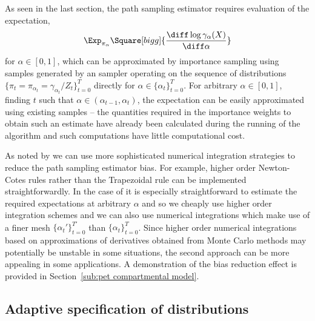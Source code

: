 As seen in the last section, the path sampling estimator requires evaluation
of the expectation,
\begin{equation*}
  \Exp_{\pi_\alpha}\Square[bigg]{
    \frac{\diff\log\gamma_{\alpha}(X)}{\diff\alpha}}
\end{equation*}
for $\alpha\in[0,1]$, which can be approximated by importance sampling using
samples generated by an \smc sampler operating on the sequence of
distributions $\{\pi_t = \pi_{\alpha_t} = \gamma_{\alpha_t}/Z_t\}_{t=0}^T$
directly for $\alpha\in\{\alpha_t\}_{t=0}^T$. For arbitrary $\alpha\in[0,1]$,
finding $t$ such that $\alpha\in(\alpha_{t-1},\alpha_t)$, the expectation can
be easily approximated using existing \smc samples -- the quantities required
in the importance weights to obtain such an estimate have already been
calculated during the running of the \smc algorithm and such computations have
little computational cost.

As noted by \cite{Friel:2012}  we can use more sophisticated numerical
integration strategies to reduce the path sampling estimator bias. For
example, higher order Newton-Cotes rules rather than the Trapezoidal rule can
be implemented straightforwardly. In the case of \smc it is especially
straightforward to estimate the required expectations at arbitrary $\alpha$
and so we cheaply use higher order integration schemes and we can also use
numerical integrations which make use of a finer mesh
$\{\alpha_t'\}_{t=0}^{T'}$ than $\{\alpha_t\}_{t=0}^T$. Since higher order
numerical integrations based on approximations of derivatives obtained from
Monte Carlo methods may potentially be unstable in some situations, the second
approach can be more appealing in some applications. A demonstration of the
bias reduction effect is provided in Section~\ref{sub:pet compartmental
  model}.

\subsection{Adaptive specification of distributions}
\label{sub:Adaptive specification of distributions}


